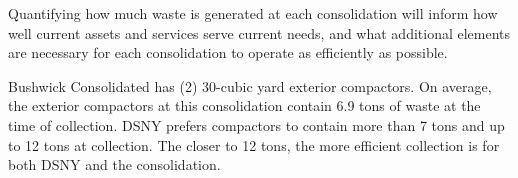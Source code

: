 
    Quantifying how much waste is generated at each consolidation will inform how well current assets and services serve current needs, and what additional elements are necessary for each consolidation to operate as efficiently as possible.
    
    Bushwick Consolidated has (2) 30-cubic yard exterior compactors. On average, the exterior compactors at this consolidation contain 6.9 tons of waste at the time of collection. DSNY prefers compactors to contain more than 7 tons and up to 12 tons at collection. The closer to 12 tons, the more efficient collection is for both DSNY and the consolidation.